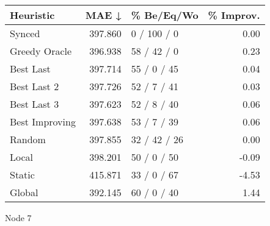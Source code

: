 \begin{tabular}{lrlr}
\toprule
\textbf{Heuristic} & \textbf{MAE ↓} & \textbf{\% Be/Eq/Wo} & \textbf{\% Improv.} \\
\midrule
            Synced &        397.860 &          0 / 100 / 0 &                0.00 \\
     Greedy Oracle &        396.938 &          58 / 42 / 0 &                0.23 \\
         Best Last &        397.714 &          55 / 0 / 45 &                0.04 \\
       Best Last 2 &        397.726 &          52 / 7 / 41 &                0.03 \\
       Best Last 3 &        397.623 &          52 / 8 / 40 &                0.06 \\
    Best Improving &        397.638 &          53 / 7 / 39 &                0.06 \\
            Random &        397.855 &         32 / 42 / 26 &                0.00 \\
             Local &        398.201 &          50 / 0 / 50 &               -0.09 \\
            Static &        415.871 &          33 / 0 / 67 &               -4.53 \\
            Global &        392.145 &          60 / 0 / 40 &                1.44 \\
\bottomrule
\end{tabular}
\caption{Node 7}
\label{tab:iid_lr01_le1_bs2_7}
